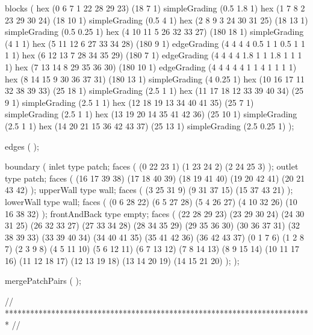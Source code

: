 \begin{OFverbatim}
blocks
(
    hex (0 6 7 1 22 28 29 23) (18 7 1) simpleGrading (0.5 1.8 1)
    hex (1 7 8 2 23 29 30 24) (18 10 1) simpleGrading (0.5 4 1)
    hex (2 8 9 3 24 30 31 25) (18 13 1) simpleGrading (0.5 0.25 1)
    hex (4 10 11 5 26 32 33 27) (180 18 1) simpleGrading (4 1 1)
    hex (5 11 12 6 27 33 34 28) (180 9 1) edgeGrading (4 4 4 4 0.5 1 1 0.5 1 1 1 1)
    hex (6 12 13 7 28 34 35 29) (180 7 1) edgeGrading (4 4 4 4 1.8 1 1 1.8 1 1 1 1)
    hex (7 13 14 8 29 35 36 30) (180 10 1) edgeGrading (4 4 4 4 4 1 1 4 1 1 1 1)
    hex (8 14 15 9 30 36 37 31) (180 13 1) simpleGrading (4 0.25 1)
    hex (10 16 17 11 32 38 39 33) (25 18 1) simpleGrading (2.5 1 1)
    hex (11 17 18 12 33 39 40 34) (25 9 1) simpleGrading (2.5 1 1)
    hex (12 18 19 13 34 40 41 35) (25 7 1) simpleGrading (2.5 1 1)
    hex (13 19 20 14 35 41 42 36) (25 10 1) simpleGrading (2.5 1 1)
    hex (14 20 21 15 36 42 43 37) (25 13 1) simpleGrading (2.5 0.25 1)
);

edges
(
);

boundary
(
    inlet
    {
        type patch;
        faces
        (
            (0 22 23 1)
            (1 23 24 2)
            (2 24 25 3)
        );
    }
    outlet
    {
        type patch;
        faces
        (
            (16 17 39 38)
            (17 18 40 39)
            (18 19 41 40)
            (19 20 42 41)
            (20 21 43 42)
        );
    }
    upperWall
    {
        type wall;
        faces
        (
            (3 25 31 9)
            (9 31 37 15)
            (15 37 43 21)
        );
    }
    lowerWall
    {
        type wall;
        faces
        (
            (0 6 28 22)
            (6 5 27 28)
            (5 4 26 27)
            (4 10 32 26)
            (10 16 38 32)
        );
    }
    frontAndBack
    {
        type empty;
        faces
        (
            (22 28 29 23)
            (23 29 30 24)
            (24 30 31 25)
            (26 32 33 27)
            (27 33 34 28)
            (28 34 35 29)
            (29 35 36 30)
            (30 36 37 31)
            (32 38 39 33)
            (33 39 40 34)
            (34 40 41 35)
            (35 41 42 36)
            (36 42 43 37)
            (0 1 7 6)
            (1 2 8 7)
            (2 3 9 8)
            (4 5 11 10)
            (5 6 12 11)
            (6 7 13 12)
            (7 8 14 13)
            (8 9 15 14)
            (10 11 17 16)
            (11 12 18 17)
            (12 13 19 18)
            (13 14 20 19)
            (14 15 21 20)
        );
    }
);

mergePatchPairs
(
);

// ************************************************************************* //
\end{OFverbatim}
